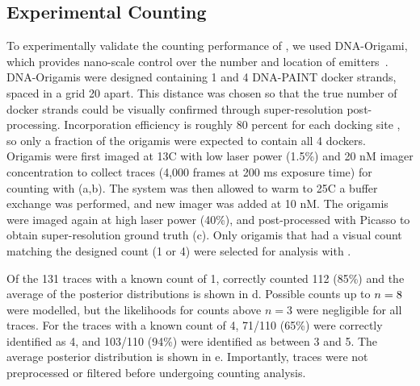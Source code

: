 \subsection{Experimental Counting}
To experimentally validate the counting performance of \ours, we used DNA-Origami, 
which provides nano-scale control over the number and location of emitters~\citep{rothemund_folding_2006}.
	DNA-Origamis were designed containing 1 and 4 DNA-PAINT docker strands, 
	spaced in a grid 20 \nanometer apart. 
	This distance was chosen so that the true number of docker strands 
	could be visually confirmed through super-resolution post-processing.
	Incorporation efficiency is roughly 80 percent for each docking site \cite{strauss_2018}, 
	so only a fraction of the origamis were expected to contain all 4 dockers. 
	Origamis were first imaged at 13\textdegree C with low laser power (1.5\%) and 20 nM imager concentration to 
	collect traces (4,000 frames at 200 ms exposure time) for counting with \ours (a,b).
	The system was then allowed to warm to 25\textdegree C a buffer exchange was performed, and new imager 
	was added at 10 nM.
	The origamis were imaged again at high laser power (40\%),
	and post-processed with Picasso \citep{schnitzbauer_2017} to obtain super-resolution ground truth (c).
	Only origamis that had a visual count matching the designed count (1 or 4) were selected for analysis with \ours.

Of the 131 traces with a known count of 1, \ours correctly counted 112 (85\%)
and the average of the posterior distributions is shown in d.
	Possible counts up to $n=8$ were modelled, but the likelihoods for counts above $n=3$ were negligible for all traces.
	For the traces with a known count of 4, 71/110 (65\%) were correctly identified as 4, 
	and 103/110 (94\%) were identified as between 3 and 5. 
	The average posterior distribution is shown in e.
	Importantly, traces were not preprocessed or filtered before undergoing \ours counting analysis.
